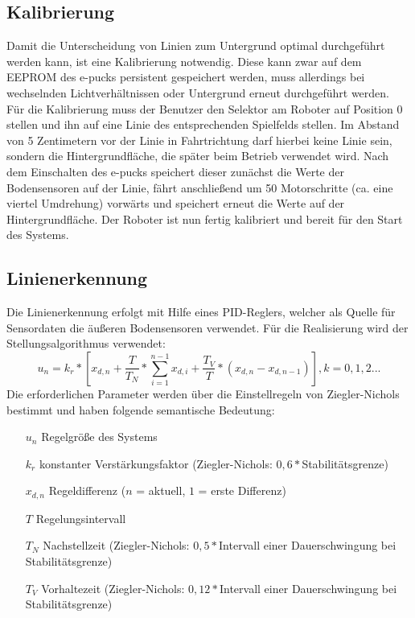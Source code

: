 \documentclass[10pt,a4paper]{article}
\begin{document}
		\subsection{Kalibrierung}
			Damit die Unterscheidung von Linien zum Untergrund optimal durchgeführt werden kann, ist eine Kalibrierung notwendig. Diese kann
			zwar auf dem EEPROM des e-pucks persistent gespeichert werden, muss allerdings bei wechselnden Lichtverhältnissen oder Untergrund
			erneut durchgeführt werden. \\
			Für die Kalibrierung muss der Benutzer den Selektor am Roboter auf Position 0 stellen und ihn auf eine Linie des entsprechenden
			Spielfelds stellen. Im Abstand von 5 Zentimetern vor der Linie in Fahrtrichtung darf hierbei keine Linie sein, sondern die
			Hintergrundfläche, die später beim Betrieb verwendet wird. Nach dem Einschalten des e-pucks speichert dieser zunächst die Werte der
			Bodensensoren auf der Linie, fährt anschließend	um 50 Motorschritte (ca. eine viertel Umdrehung) vorwärts und speichert erneut
			die Werte auf der Hintergrundfläche. Der Roboter ist nun fertig kalibriert und bereit für den Start des Systems.
		\subsection{Linienerkennung}
			Die Linienerkennung erfolgt mit Hilfe eines PID-Reglers, welcher als Quelle für Sensordaten die äußeren Bodensensoren verwendet.
			Für die Realisierung wird der Stellungsalgorithmus verwendet:
			\begin{equation}
				u_n = k_r * \left[ x_{d,n} + \frac{T}{T_N} * \sum_{i=1}^{n-1}x_{d,i} + \frac{T_V}{T}*(x_{d,n}-x_{d,n-1}) \right], k=0,1,2...
			\end{equation}
			Die erforderlichen Parameter werden über die Einstellregeln von Ziegler-Nichols bestimmt und haben folgende semantische Bedeutung:
			\begin{itemize}
				\item[$u_n$] Regelgröße des Systems
				\item[$k_r$] konstanter Verstärkungsfaktor (Ziegler-Nichols: $0,6 * $Stabilitätsgrenze)
				\item[$x_{d,n}$] Regeldifferenz ($n$ = aktuell, $1$ = erste Differenz)
				\item[$T$] Regelungsintervall
				\item[$T_N$] Nachstellzeit (Ziegler-Nichols: $0,5 * $Intervall einer Dauerschwingung bei Stabilitätsgrenze)
				\item[$T_V$] Vorhaltezeit (Ziegler-Nichols: $0,12 * $Intervall einer Dauerschwingung bei Stabilitätsgrenze)
			\end{itemize}		
\end{document}
